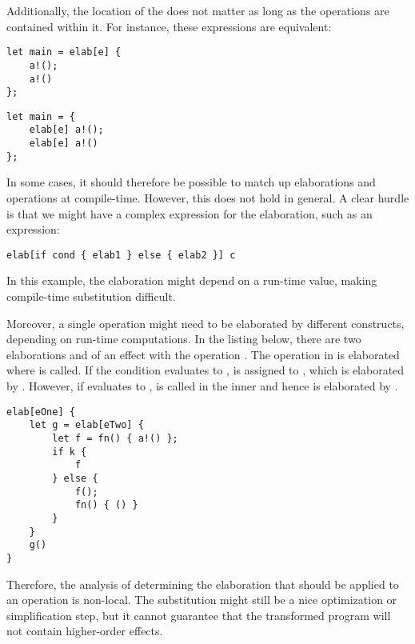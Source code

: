 Additionally, the location of the  does not matter as long as the operations are contained within it. For instance, these expressions are equivalent:

\begin{minipage}[b]{0.5\textwidth}
\begin{lstlisting}[language=elaine,style=fancy]
let main = elab[e] {
    a!();
    a!()
};
\end{lstlisting}
\end{minipage}
\begin{minipage}[b]{0.5\textwidth}
\begin{lstlisting}[language=elaine,style=fancy]
let main = {
    elab[e] a!();
    elab[e] a!()
};
\end{lstlisting}
\end{minipage}

In some cases, it should therefore be possible to match up elaborations and operations at compile-time. However, this does not hold in general. A clear hurdle is that we might have a complex expression for the elaboration, such as an  expression:
\begin{lstlisting}[language=elaine,style=fancy]
elab[if cond { elab1 } else { elab2 }] c
\end{lstlisting}
In this example, the elaboration might depend on a run-time value, making compile-time substitution difficult.

Moreover, a single operation might need to be elaborated by different  constructs, depending on run-time computations. In the listing below, there are two elaborations  and  of an effect with the operation . The  operation in  is elaborated where  is called. If the condition  evaluates to ,  is assigned to , which is elaborated by . However, if  evaluates to ,  is called in the inner  and hence  is elaborated by .

\begin{lstlisting}[language=elaine,style=fancy]
elab[eOne] {
    let g = elab[eTwo] {
        let f = fn() { a!() };
        if k {
            f
        } else {
            f();
            fn() { () }
        }
    }
    g()
}
\end{lstlisting}

Therefore, the analysis of determining the elaboration that should be applied to an operation is non-local. The substitution might still be a nice optimization or simplification step, but it cannot guarantee that the transformed program will not contain higher-order effects.

